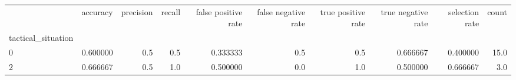 \begin{tabular}{lrrrrrrrrr}
\toprule
{} &  accuracy &  precision &  recall &  false positive rate &  false negative rate &  true positive rate &  true negative rate &  selection rate &  count \\
tactical\_situation &           &            &         &                      &                      &                     &                     &                 &        \\
\midrule
0                  &  0.600000 &        0.5 &     0.5 &             0.333333 &                  0.5 &                 0.5 &            0.666667 &        0.400000 &   15.0 \\
2                  &  0.666667 &        0.5 &     1.0 &             0.500000 &                  0.0 &                 1.0 &            0.500000 &        0.666667 &    3.0 \\
\bottomrule
\end{tabular}
